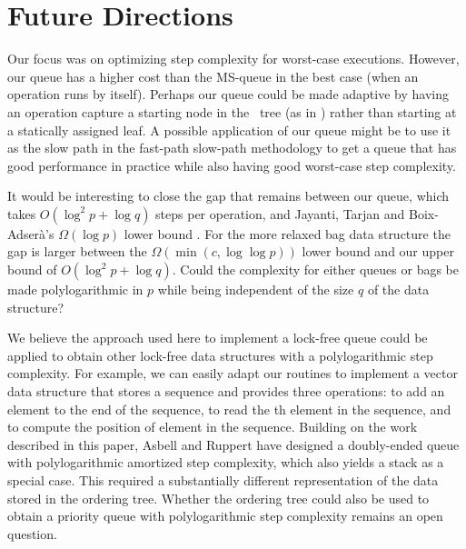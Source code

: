 
\section{Future Directions}

Our focus was on optimizing step complexity for worst-case executions.
However, our queue has a higher cost than the MS-queue in the best case (when an operation
runs by itself).
Perhaps our queue could be made adaptive by having an operation capture a starting node
in the \ordering\ tree (as in \cite{DBLP:conf/stoc/AfekDT95}) rather than starting at a statically assigned leaf.
A possible application of our queue  might be to use it as the slow path in the
fast-path slow-path methodology  \cite{10.1145/2370036.2145835} to
get a queue that has good performance in practice while also having good worst-case step complexity.

It would be interesting to close the gap that remains between our queue, which takes $O(\log^2 p + \log q)$ steps per operation,
and Jayanti, Tarjan and Boix-Adser\`{a}'s $\Omega(\log p)$ lower bound \cite{JTB19}.
For the more relaxed bag data structure the gap is larger between the  $\Omega(\min(c,\log\log p))$ lower bound \cite{DBLP:conf/opodis/AttiyaF17} and our upper bound of $O(\log^2 p + \log q)$.
Could the complexity for either queues or bags be made polylogarithmic in $p$ while being independent of the size $q$ of the data structure?

We believe the approach used here to implement a lock-free queue 
could be applied to obtain other lock-free
data structures with a polylogarithmic step complexity.
For example, we can easily adapt our routines to implement a  vector data structure that stores a sequence and
provides three operations:  to add an element  to the end of the sequence,
 to read the th element in the sequence, and
 to compute the position of element  in the sequence.
Building on the work described in this paper, Asbell and Ruppert \cite{AR23} have
designed a doubly-ended queue with polylogarithmic amortized step
complexity, which also yields a stack as a special case.  
This required a substantially different representation of the data stored in the ordering tree.
Whether the ordering tree could also be used to obtain a priority queue with polylogarithmic step complexity
remains an open question.


